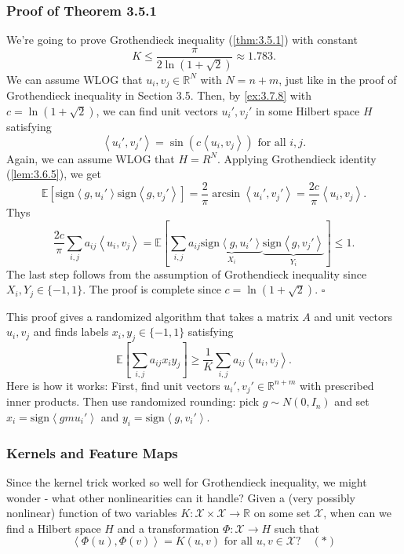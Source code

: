 \subsubsection{Proof of Theorem 3.5.1}
We're going to prove Grothendieck inequality (\cref{thm:3.5.1}) with constant 
\[ K \leq \frac{\pi}{2 \ln{(1 + \sqrt{2})}} \approx 1.783. \]
We can assume WLOG that $u_i, v_j \in \mathbb{R}^N$ with $N = n + m$, just like in the proof of Grothendieck 
inequality in Section 3.5. Then, by \cref{ex:3.7.8} with $c = \ln{(1 + \sqrt{2})}$, we can find unit vectors 
$u_i', v_j'$ in some Hilbert space $H$ satisfying 
\[ \left\langle u_i', v_j' \right\rangle = \sin{(c \left\langle u_i, v_j \right\rangle)} 
\text{ for all } i, j. \]
Again, we can assume WLOG that $H = R^N$. Applying Grothendieck identity (\cref{lem:3.6.5}), we get 
\[ \mathbb{E}\left[ \mathrm{sign}\left\langle g, u_i' \right\rangle 
\mathrm{sign}\left\langle g, v_j' \right\rangle \right] 
= \frac{2}{\pi}\arcsin{\left\langle u_i', v_j' \right\rangle} 
= \frac{2c}{\pi}\left\langle u_i, v_j \right\rangle. \]
Thys 
\[ \frac{2c}{\pi} \sum_{i, j}^{}a_{ij}\left\langle u_i, v_j \right\rangle 
= \mathbb{E}\left[ \sum_{i, j}^{}a_{ij} \underbrace{\mathrm{sign}\left\langle g, u_i' \right\rangle}_{X_i}
\underbrace{\mathrm{sign}\left\langle g, v_j' \right\rangle}_{Y_i} \right] \leq 1. \]
The last step follows from the assumption of Grothendieck inequality since $X_i, Y_j \in \{-1, 1\}$. The 
proof is complete since $c = \ln{(1 + \sqrt{2})}$. $\square$

\begin{remark}
\label{rmk:3.7.9}
This proof gives a randomized algorithm that takes a matrix $A$ and unit vectors $u_i, v_j$ and finds labels 
$x_i, y_j \in \{-1, 1\}$ satisfying 
\[ \mathbb{E}\left[ \sum_{i, j}^{}a_{ij}x_iy_j \right] \geq \frac{1}{K} \sum_{i, j}^{}a_{ij} 
\left\langle u_i, v_j \right\rangle. \]
Here is how it works: First, find unit vectors $u_i', v_j' \in \mathbb{R}^{n + m}$ with prescribed inner 
products. Then use randomized rounding: pick $g \sim N(0, I_n)$ and set $x_i = \mathrm{sign}\left\langle 
gm u_i' \right\rangle$ and $y_i = \mathrm{sign}\left\langle g, v_i' \right\rangle$.
\end{remark}


\subsubsection{Kernels and Feature Maps}
Since the kernel trick worked so well for Grothendieck inequality, we might wonder - what other nonlinearities 
can it handle? Given a (very possibly nonlinear) function of two variables $K: \mathcal{X} \times \mathcal{X} 
\to \mathbb{R}$ on some set $\mathcal{X}$, when can we find a Hilbert space $H$ and a transformation 
$\Phi: \mathcal{X} \to H$ such that 
\[ \left\langle \Phi(u), \Phi(v) \right\rangle = K(u, v) \text{ for all } u, v \in \mathcal{X}? \quad (*) \]

